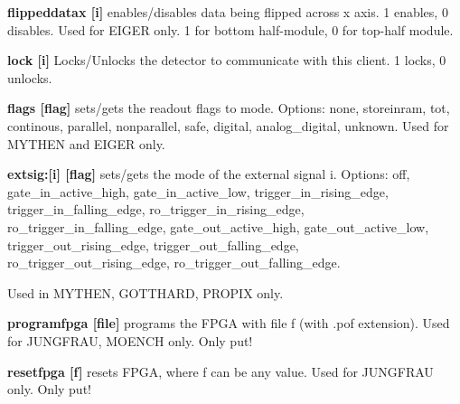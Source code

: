 \begin{DoxyItemize}
\item {\bfseries flippeddatax \mbox{[}i\mbox{]}} enables/disables data being flipped across x axis. 1 enables, 0 disables. Used for EIGER only. 1 for bottom half-\/module, 0 for top-\/half module.
\end{DoxyItemize}


\begin{DoxyItemize}
\item {\bfseries lock \mbox{[}i\mbox{]}} Locks/Unlocks the detector to communicate with this client. 1 locks, 0 unlocks.
\end{DoxyItemize}


\begin{DoxyItemize}
\item {\bfseries flags \mbox{[}flag\mbox{]}} sets/gets the readout flags to mode. Options: none, storeinram, tot, continous, parallel, nonparallel, safe, digital, analog\_\-digital, unknown. Used for MYTHEN and EIGER only.
\end{DoxyItemize}


\begin{DoxyItemize}
\item {\bfseries extsig:\mbox{[}i\mbox{]} \mbox{[}flag\mbox{]}} sets/gets the mode of the external signal i. Options: {\ttfamily off}, {\ttfamily gate\_\-in\_\-active\_\-high}, {\ttfamily gate\_\-in\_\-active\_\-low}, {\ttfamily trigger\_\-in\_\-rising\_\-edge}, {\ttfamily trigger\_\-in\_\-falling\_\-edge}, {\ttfamily ro\_\-trigger\_\-in\_\-rising\_\-edge}, {\ttfamily ro\_\-trigger\_\-in\_\-falling\_\-edge}, {\ttfamily gate\_\-out\_\-active\_\-high}, {\ttfamily gate\_\-out\_\-active\_\-low}, {\ttfamily trigger\_\-out\_\-rising\_\-edge}, {\ttfamily trigger\_\-out\_\-falling\_\-edge}, {\ttfamily ro\_\-trigger\_\-out\_\-rising\_\-edge}, {\ttfamily ro\_\-trigger\_\-out\_\-falling\_\-edge}. \par
 Used in MYTHEN, GOTTHARD, PROPIX only.
\end{DoxyItemize}


\begin{DoxyItemize}
\item {\bfseries programfpga \mbox{[}file\mbox{]}} programs the FPGA with file f (with .pof extension). Used for JUNGFRAU, MOENCH only. Only put!
\end{DoxyItemize}


\begin{DoxyItemize}
\item {\bfseries resetfpga \mbox{[}f\mbox{]}} resets FPGA, where f can be any value. Used for JUNGFRAU only. Only put!
\end{DoxyItemize}


